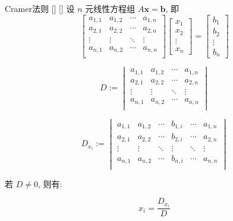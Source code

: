 \documentclass[UTF8]{ctexart}
\DeclareMathOperator{\0}{\mathbf{0}}
\DeclareMathOperator{\<}{\langle}
\renewcommand{\>}{\rangle}
\begin{document}
		\begin{thm}
			[]
			{Cramer法则}
			[]
			[]
			设 \(n\) 元线性方程组 \(A\mathbf{x}=\mathbf{b}\), 即
			\[
			\begin{bmatrix}
				a_{1,1} & a_{1,2} & \cdots & a_{1,n}\\
				a_{2,1} & a_{2,2} & \cdots & a_{2,n}\\
				\vdots & \vdots & \ddots & \vdots\\
				a_{n,1} & a_{n,2} & \cdots & a_{n,n}\\
			\end{bmatrix}
			\begin{bmatrix}
				x_1\\
				x_2\\
				\vdots\\
				x_n
			\end{bmatrix}=
			\begin{bmatrix}
				b_1\\
				b_2\\
				\vdots\\
				b_n
			\end{bmatrix}
			\]
			
			\[
			D:=
			\begin{vmatrix}
				a_{1,1} & a_{1,2} & \cdots & a_{1,n}\\
				a_{2,1} & a_{2,2} & \cdots & a_{2,n}\\
				\vdots & \vdots & \ddots & \vdots\\
				a_{n,1} & a_{n,2} & \cdots & a_{n,n}\\
			\end{vmatrix}\]
			
			\[
			D_{x_i}:=
			\begin{vmatrix}
				a_{1,1} & a_{1,2} & \cdots & b_{1,i} & \cdots & a_{1,n}\\
				a_{2,1} & a_{2,2} & \cdots & b_{2,i} & \cdots & a_{2,n}\\
				\vdots & \vdots & \ddots & \vdots & \ddots & \vdots\\
				a_{n,1} & a_{n,2} & \cdots & b_{n,i} & \cdots & a_{n,n}\\
			\end{vmatrix}
			\]
			
			若 \(D\neq 0\), 则有: 
			
			\[x_i=\frac{D_{x_i}}{D}\]
		\end{thm}
\end{document}

